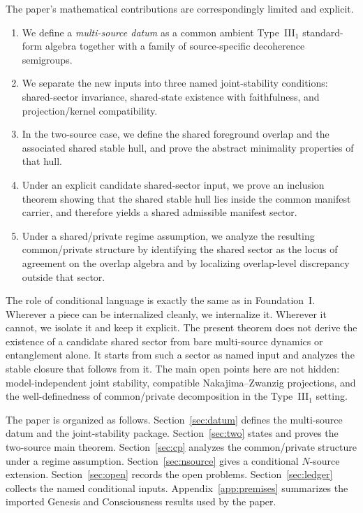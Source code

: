\documentclass[12pt]{article}
\theoremstyle{definition}
\theoremstyle{remark}
\begin{document}
The paper's mathematical contributions are correspondingly limited and
explicit.
\begin{enumerate}
\item We define a \emph{multi-source datum} as a common ambient
  Type~III\(_1\) standard-form algebra together with a family of
  source-specific decoherence semigroups.
\item We separate the new inputs into three named
  joint-stability conditions: shared-sector invariance,
  shared-state existence with faithfulness, and projection/kernel
  compatibility.
\item In the two-source case, we define the shared foreground overlap
  and the associated shared stable hull, and prove the abstract
  minimality properties of that hull.
\item Under an explicit candidate shared-sector input, we prove an
  inclusion theorem showing that the shared stable hull lies inside the
  common manifest carrier, and therefore yields a shared admissible
  manifest sector.
\item Under a shared/private regime assumption, we analyze the resulting
  common/private structure by identifying the shared sector as the locus
  of agreement on the overlap algebra and by localizing overlap-level
  discrepancy outside that sector.
\end{enumerate}

The role of conditional language is exactly the same as in
Foundation~I. Wherever a piece can be internalized cleanly, we
internalize it. Wherever it cannot, we isolate it and keep it explicit.
The present theorem does not derive the existence of a candidate shared
sector from bare multi-source dynamics or entanglement alone. It starts
from such a sector as named input and analyzes the stable closure that
follows from it.
The main open points here are not hidden: model-independent joint
stability, compatible Nakajima--Zwanzig projections, and the
well-definedness of common/private decomposition in the Type~III\(_1\)
setting.

The paper is organized as follows. Section~\ref{sec:datum} defines the
multi-source datum and the joint-stability package. Section~\ref{sec:two}
states and proves the two-source main theorem. Section~\ref{sec:cp}
analyzes the common/private structure under a regime assumption.
Section~\ref{sec:nsource} gives a conditional \(N\)-source extension.
Section~\ref{sec:open} records the open problems. Section~\ref{sec:ledger}
collects the named conditional inputs. Appendix~\ref{app:premises}
summarizes the imported Genesis and Consciousness results used by the
paper.
\end{document}
